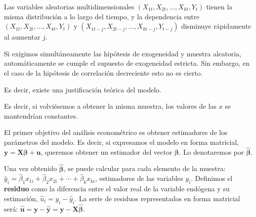 Las variables aleatorias multidimensionales $(X_{1t},X_{2t},\ldots,X_{kt},Y_{t})$ tienen la misma distribuci\'on a lo largo del tiempo, y la dependencia entre $(X_{1t},X_{2t},\ldots,X_{kt},Y_{t})$ y $(X_{1t-j},X_{2t-j},\ldots,X_{kt-j},Y_{t-j})$ disminuye r\'apidamente al aumentar $j$.

Si exigimos simult\'aneamente las hip\'otesis de exogeneidad y muestra aleatoria, autom\'aticamente se cumple el supuesto de exogeneidad estricta. Sin embargo, en el caso de la hip\'otesis de correlaci\'on decreciente esto no es cierto.



Es decir, existe una justificaci\'on te\'orica del modelo.



Es decir, si volvi\'esemos a obtener la misma muestra, los valores de
las $x$ se mantendr\'ian constantes.



El primer objetivo del an\'alisis econom\'etrico es obtener estimadores
de los par\'ametros del modelo. Es decir, si expresamos el modelo en
forma matricial, $\boldsymbol{y}=\boldsymbol{X\beta}+\boldsymbol{u}$,
queremos obtener un estimador del vector $\boldsymbol{\beta}$. Lo
denotaremos por $\hat{\boldsymbol{\beta}}$.

Una vez obtenido $\hat{\boldsymbol{\beta}}$, se puede calcular para
cada elemento de la muestra: $\hat{y}_{i}=\hat{\beta}_{1}x_{1i}+\hat{\beta}_{2}x_{2i}+\cdots+\hat{\beta}_{k}x_{ki}$,
estimadores de las variables $y_{i}$. Definimos el \textbf{residuo}
como la diferencia entre el valor real de la variable end\'ogena y su
estimaci\'on, $\hat{u}_{i}=y_{i}-\hat{y}_{i}$. La serie de residuos
representados en forma matricial ser\'a: $\hat{\boldsymbol{u}}=\boldsymbol{y}-\hat{\boldsymbol{y}}=\boldsymbol{y}-\boldsymbol{X}\hat{\boldsymbol{\beta}}$.

